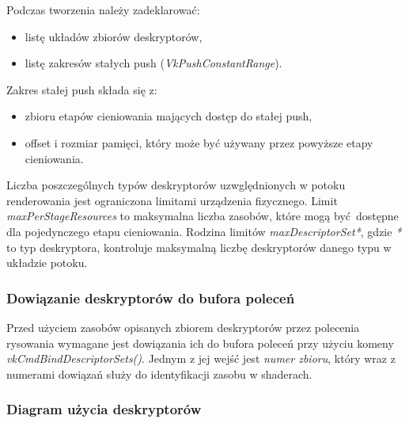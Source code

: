 Podczas tworzenia należy zadeklarować:
\begin{itemize}
	\item listę układów zbiorów deskryptorów,
	\item listę zakresów stałych push (\textit{VkPushConstantRange}).
\end{itemize}

Zakres stałej push składa się z:
\begin{itemize}
	\item zbioru etapów cieniowania mających dostęp do stałej push,
	\item offset i rozmiar pamięci, który może być używany przez powyższe etapy cieniowania.
\end{itemize}

Liczba poszczególnych typów deskryptorów uzwględnionych w potoku renderowania jest ograniczona limitami urządzenia fizycznego.
Limit \textit{maxPerStageResources} to maksymalna liczba zasobów, które mogą być dostępne dla pojedynczego etapu cieniowania.
Rodzina limitów \textit{maxDescriptorSet*}, gdzie \textit{*} to typ deskryptora, kontroluje maksymalną liczbę deskryptorów danego typu w układzie potoku.

\subsubsection{Dowiązanie deskryptorów do bufora poleceń}

Przed użyciem zasobów opisanych zbiorem deskryptorów przez polecenia rysowania wymagane jest dowiązania ich do bufora
poleceń przy użyciu komeny \textit{vkCmdBindDescriptorSets()}. Jednym z jej wejść jest \textit{numer zbioru}, który wraz z numerami
dowiązań służy do identyfikacji zasobu w shaderach.


\subsubsection{Diagram użycia deskryptorów}

